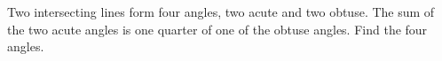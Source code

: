 Two intersecting lines form four angles, two acute and two obtuse. The sum of the two acute angles is one quarter of one of the obtuse angles. Find the four angles.
